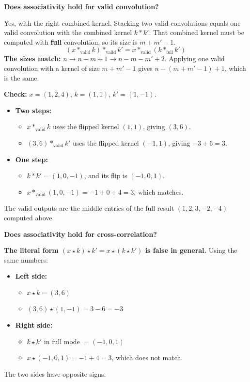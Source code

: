 \textbf{Does associativity hold for valid convolution?}

Yes, with the right combined kernel. Stacking two valid convolutions equals one valid convolution with the combined kernel $k * k'$. That combined kernel must be computed with \textbf{full} convolution, so its size is $m + m' - 1$.
\[
(x *_{\text{valid}} k) *_{\text{valid}} k' = x *_{\text{valid}} (k *_{\text{full}} k')
\]
\textbf{The sizes match:} $n \to n - m + 1 \to n - m - m' + 2$. Applying one valid convolution with a kernel of size $m + m' - 1$ gives $n - (m + m' - 1) + 1$, which is the same.

\textbf{Check:} $x = (1, 2, 4)$, $k = (1, 1)$, $k' = (1, -1)$.
\begin{itemize}
  \item \textbf{Two steps:}
  \begin{itemize}
    \item $x *_{\text{valid}} k$ uses the flipped kernel $(1, 1)$, giving $(3, 6)$.
    \item $(3, 6) *_{\text{valid}} k'$ uses the flipped kernel $(-1, 1)$, giving $-3 + 6 = 3$.
  \end{itemize}
  \item \textbf{One step:}
  \begin{itemize}
    \item $k * k' = (1, 0, -1)$, and its flip is $(-1, 0, 1)$.
    \item $x *_{\text{valid}} (1, 0, -1) = -1 + 0 + 4 = 3$, which matches.
  \end{itemize}
\end{itemize}
The valid outputs are the middle entries of the full result $(1, 2, 3, -2, -4)$ computed above.

\textbf{Does associativity hold for cross-correlation?}

\textbf{The literal form $(x \star k) \star k' = x \star (k \star k')$ is false in general.} Using the same numbers:
\begin{itemize}
  \item \textbf{Left side:}
  \begin{itemize}
    \item $x \star k = (3, 6)$
    \item $(3, 6) \star (1, -1) = 3 - 6 = -3$
  \end{itemize}
  \item \textbf{Right side:}
  \begin{itemize}
    \item $k \star k'$ in full mode $= (-1, 0, 1)$
    \item $x \star (-1, 0, 1) = -1 + 4 = 3$, which does not match.
  \end{itemize}
\end{itemize}
The two sides have opposite signs.

